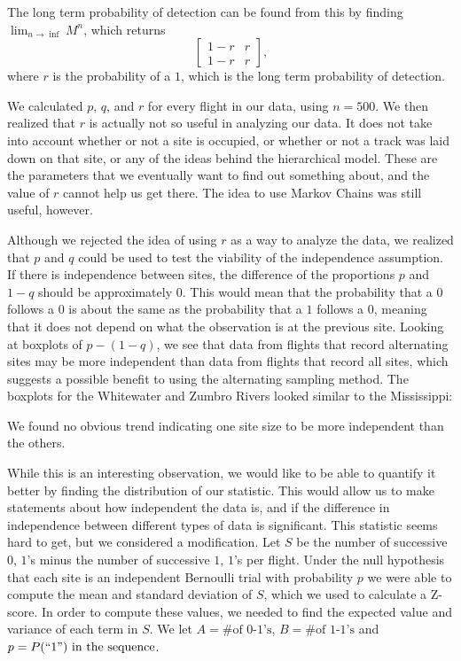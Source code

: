 \documentclass[12pt]{article}
\begin{document}
    The long term probability of detection can be found from this by finding
    \(\lim_{n \to \inf}M^n\), which returns
    \[\begin{bmatrix}
        1-r & r \\
        1-r & r
    \end{bmatrix}\text{,}\]
    where \(r\) is the probability of a \(1\), which is the long term
    probability of detection.

    We calculated \(p\), \(q\), and \(r\) for every flight in our data, using
    \(n = 500\). We then realized that \(r\) is actually not so useful in
    analyzing our data. It does not take into account whether or not a site is
    occupied, or whether or not a track was laid down on that site, or any of
    the ideas behind the hierarchical model. These are the parameters that we
    eventually want to find out something about, and the value of \(r\) cannot
    help us get there. The idea to use Markov Chains was still useful, however.

    Although we rejected the idea of using \(r\) as a way to analyze the data,
    we realized that \(p\) and \(q\) could be used to test the viability of the
    independence assumption. If there is independence between sites, the
    difference of the proportions \(p\) and \(1-q\) should be approximately
    \(0\). This would mean that the probability that a \(0\) follows a \(0\) is
    about the same as the probability that a \(1\) follows a \(0\), meaning that
    it does not depend on what the observation is at the previous site. Looking
    at boxplots of \(p-(1-q)\), we see that data from flights that record
    alternating sites may be more independent than data from flights that record
    all sites, which suggests a possible benefit to using the alternating
    sampling method. The boxplots for the Whitewater and Zumbro Rivers looked
    similar to the Mississippi:

    We found no obvious trend indicating one site size to be more independent
    than the others.

    While this is an interesting observation, we would like to be able to
    quantify it better by finding the distribution of our statistic. This would
    allow us to make statements about how independent the data is, and if the
    difference in independence between different types of data is significant.
    This statistic seems hard to get, but we considered a modification. Let
    \(S\) be the number of successive \(0\), \(1\)'s minus the number of
    successive \(1\), \(1\)'s per flight. Under the null hypothesis that each
    site is an independent Bernoulli trial with probability \(p\) we were able
    to compute the mean and standard deviation of \(S\), which we used to
    calculate a Z-score. In order to compute these values, we needed to find the
    expected value and variance of each term in \(S\). We let \(A = \text{\# of
    0-1's}\), \(B=\text{\# of 1-1's}\) and \(p=P(``1")\text{ in the sequence}\).
\end{document}
